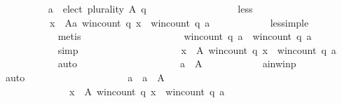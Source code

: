 \begin{isabellebody}
\ \isamarkupfalse%
\isanewline
\ \ \ \ \ \ \ \ {\isachardoublequoteopen}a\ {\isasymin}\ elect\ plurality\ A\ q{\isachardoublequoteclose}\isanewline
\ \ \ \ \ \ \isamarkupfalse%
\ {\isacharminus}{\kern0pt}\isanewline
\ \ \ \ \ \ \ \ \isamarkupfalse%
\ less\isanewline
\ \ \ \ \ \ \ \ \isamarkupfalse%
\isanewline
\ \ \ \ \ \ \ \ \ \ {\isachardoublequoteopen}{\isasymforall}x\ {\isasymin}\ A{\isacharminus}{\kern0pt}{\isacharbraceleft}{\kern0pt}a{\isacharbraceright}{\kern0pt}{\isachardot}{\kern0pt}\ win{\isacharunderscore}{\kern0pt}count\ q\ x\ {\isasymle}\ win{\isacharunderscore}{\kern0pt}count\ q\ a{\isachardoublequoteclose}\isanewline
\ \ \ \ \ \ \ \ \ \ \isamarkupfalse%
\ less{\isacharunderscore}{\kern0pt}imp{\isacharunderscore}{\kern0pt}le\isanewline
\ \ \ \ \ \ \ \ \ \ \isamarkupfalse%
\ metis\isanewline
\ \ \ \ \ \ \ \ \isamarkupfalse%
\ \isamarkupfalse%
\isanewline
\ \ \ \ \ \ \ \ \ \ {\isachardoublequoteopen}win{\isacharunderscore}{\kern0pt}count\ q\ a\ {\isasymle}\ win{\isacharunderscore}{\kern0pt}count\ q\ a{\isachardoublequoteclose}\isanewline
\ \ \ \ \ \ \ \ \ \ \isamarkupfalse%
\ simp\isanewline
\ \ \ \ \ \ \ \ \isamarkupfalse%
\ \isamarkupfalse%
\isanewline
\ \ \ \ \ \ \ \ \ \ {\isachardoublequoteopen}{\isasymforall}x\ {\isasymin}\ A{\isachardot}{\kern0pt}\ win{\isacharunderscore}{\kern0pt}count\ q\ x\ {\isasymle}\ win{\isacharunderscore}{\kern0pt}count\ q\ a{\isachardoublequoteclose}\isanewline
\ \ \ \ \ \ \ \ \ \ \isamarkupfalse%
\ auto\isanewline
\ \ \ \ \ \ \ \ \isamarkupfalse%
\ \isamarkupfalse%
\isanewline
\ \ \ \ \ \ \ \ \ \ {\isachardoublequoteopen}a\ {\isasymin}\ A{\isachardoublequoteclose}\isanewline
\ \ \ \ \ \ \ \ \ \ \isamarkupfalse%
\ a{\isacharunderscore}{\kern0pt}in{\isacharunderscore}{\kern0pt}win{\isacharunderscore}{\kern0pt}p\isanewline
\ \ \ \ \ \ \ \ \ \ \isamarkupfalse%
\ auto\isanewline
\ \ \ \ \ \ \ \ \isamarkupfalse%
\ \isamarkupfalse%
\isanewline
\ \ \ \ \ \ \ \ \ \ {\isachardoublequoteopen}a\ {\isasymin}\ {\isacharbraceleft}{\kern0pt}a\ {\isasymin}\ A{\isachardot}{\kern0pt}\isanewline
\ \ \ \ \ \ \ \ \ \ \ \ \ \ {\isasymforall}x\ {\isasymin}\ A{\isachardot}{\kern0pt}\ win{\isacharunderscore}{\kern0pt}count\ q\ x\ {\isasymle}\ win{\isacharunderscore}{\kern0pt}count\ q\ a{\isacharbraceright}{\kern0pt}{\isachardoublequoteclose}\isanewline

\end{isabellebody}
